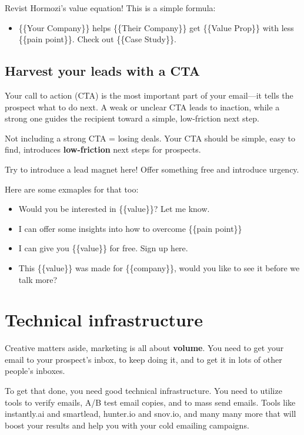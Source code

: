 \documentclass[12pt]{article}
\begin{document}
Revist Hormozi's value equation! This is a simple formula:

\begin{itemize}
	\item \{\{Your Company\}\} helps \{\{Their Company\}\} get \{\{Value Prop\}\} with less \{\{pain point\}\}. Check out \{\{Case Study\}\}.
\end{itemize}

\subsection{Harvest your leads with a CTA}
Your call to action (CTA) is the most important part of your email—it tells the prospect what to do next. A weak or unclear CTA leads to inaction, while a strong one guides the recipient toward a simple, low-friction next step. \par

Not including a strong CTA = losing deals. Your CTA should be simple, easy to find, introduces \textbf{low-friction} next steps for prospects.

Try to introduce a lead magnet here! Offer something free and introduce urgency.

Here are some exmaples for that too:

\begin{itemize}
	\item Would you be interested in \{\{value\}\}? Let me know.
	\item I can offer some insights into how to overcome \{\{pain point\}\}
	\item I can give you \{\{value\}\} for free. Sign up here.
	\item This \{\{value\}\} was made for \{\{company\}\}, would you like to see it before we talk more?
\end{itemize}

\section{Technical infrastructure}

Creative matters aside, marketing is all about \textbf{volume}. You need to get your email to your prospect's inbox, to keep doing it, and to get it in lots of other people's inboxes. \par

To get that done, you need good technical infrastructure. You need to utilize tools to verify emails, A/B test email copies, and to mass send emails. Tools like instantly.ai and smartlead, hunter.io and snov.io, and many many more that will boost your results and help you with your cold emailing campaigns. \par
\end{document}
